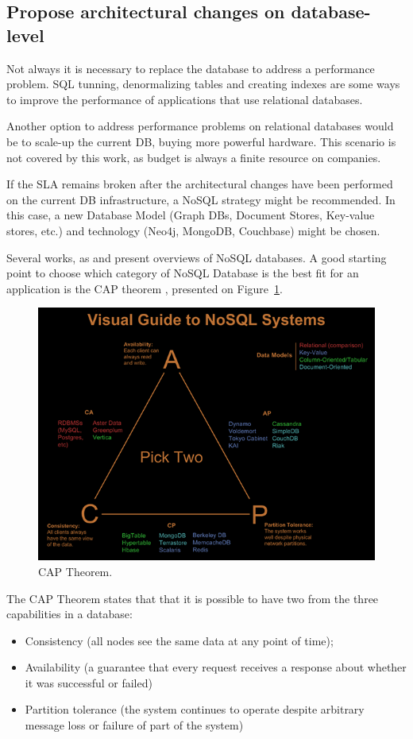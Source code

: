 \subsection{Propose architectural changes on database-level} 

Not always it is necessary to replace the database to address a performance problem. SQL tunning, denormalizing tables and creating indexes are some ways to improve the performance of applications that use relational databases.

Another option to address performance problems on relational databases would be to scale-up the current DB, buying more powerful hardware. This scenario is not covered by this work, as budget is always a finite resource on companies.

If the SLA remains broken after the architectural changes have been performed on the current DB infrastructure, a NoSQL strategy might be recommended. In this case, a new Database Model (Graph DBs, Document Stores, Key-value stores, etc.) and technology (Neo4j, MongoDB, Couchbase) might be chosen.

Several works, as \cite{6106531} and \cite{5410700} present overviews of NoSQL databases. A good starting point to choose which category of NoSQL Database is the best fit for an application is the CAP theorem \cite{nosqlthoughtworks}, presented on Figure~\ref{fig:cap}. 

\begin{figure}[ht!]
\centering
\includegraphics[width=120mm]{Imagens/cap.png}
\caption{CAP Theorem.\cite{captheorem}\label{fig:cap}}
\end{figure}

The CAP Theorem states that that it is possible to have two from the three capabilities in a database: 
\begin{itemize}
\item{Consistency (all nodes see the same data at any point of time);}
\item{Availability (a guarantee that every request receives a response about whether it was successful or failed)}
\item{Partition tolerance (the system continues to operate despite arbitrary message loss or failure of part of the system)
}
\end{itemize}

